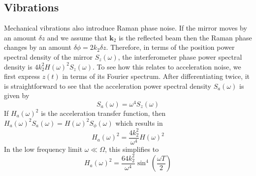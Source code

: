 \subsection{Vibrations}\label{subsec:vibration_noise}
Mechanical vibrations also introduce Raman phase
noise\nocite{Vigue2006}. 
If the mirror moves by an amount $\delta z$ and we assume that
$\textbf{k}_2$ is the reflected beam then the Raman phase changes by
an amount $\delta \phi = 2 k_2 \delta z$. Therefore, in terms
of the position power spectral density of the mirror $S_z
(\omega)$, the interferometer phase power spectral density is
$4 k_\text{2}^2 H(\omega)^2 S_z(\omega)$. To see how this relates to
acceleration noise, we first express $z(t)$ in terms of its Fourier
spectrum. After differentiating twice, it is straightforward to see
that the acceleration power spectral density $S_a(\omega)$ is given by
\begin{equation}
  S_a(\omega) = \omega^4 S_z(\omega) 
\end{equation}
If $H_a(\omega)^2$ is the acceleration transfer function, then
$H_a(\omega)^2 S_a(\omega) = H(\omega)^2 S_\phi(\omega)$ which
results in
\begin{equation}
  H_a(\omega)^2 = \frac{4k_\text{2}^2}{\omega^4}H(\omega)^2 
  \label{eq:acc_transfer}
\end{equation}
In the low frequency limit \(\omega \ll \Omega\), this simplifies to
\begin{equation}
  H_a(\omega)^2 = \frac{64 k_\text{2}^2}{\omega^4}
  \sin^4\left(\frac{\omega T}{2}\right)
  \label{eq:acc_tf_low}
\end{equation}
